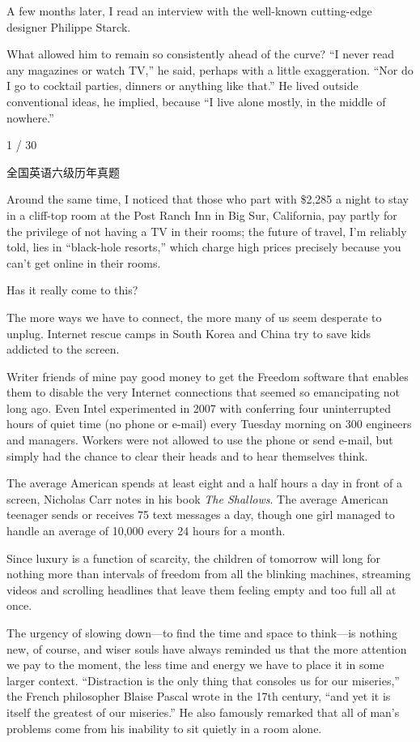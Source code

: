 \documentclass[UTF8,11pt]{ctexart}
\begin{document}
A few months later, I read an interview with the well-known cutting-edge designer Philippe Starck.


What allowed him to remain so consistently ahead of the curve? “I never read any magazines or watch TV,” he said, perhaps with a little exaggeration. “Nor do I go to cocktail parties, dinners or anything like that.” He lived outside conventional ideas, he implied, because “I live alone mostly, in the middle of nowhere.”


1 / 30


全国英语六级历年真题


Around the same time, I noticed that those who part with \$2,285 a night to stay in a cliff-top room at the Post Ranch Inn in Big Sur, California, pay partly for the privilege of not having a TV in their rooms; the future of travel, I’m reliably told, lies in “black-hole resorts,” which charge high prices precisely because you can’t get online in their rooms.


Has it really come to this?


The more ways we have to connect, the more many of us seem desperate to unplug. Internet rescue camps in South Korea and China try to save kids addicted to the screen.


Writer friends of mine pay good money to get the Freedom software that enables them to disable the very Internet connections that seemed so emancipating not long ago. Even Intel experimented in 2007 with conferring four uninterrupted hours of quiet time (no phone or e-mail) every Tuesday morning on 300 engineers and managers. Workers were not allowed to use the phone or send e-mail, but simply had the chance to clear their heads and to hear themselves think.


The average American spends at least eight and a half hours a day in front of a screen, Nicholas Carr notes in his book\textit{ The Shallows}. The average American teenager sends or receives 75 text messages a day, though one girl managed to handle an average of 10,000 every 24 hours for a month.


Since luxury is a function of scarcity, the children of tomorrow will long for nothing more than intervals of freedom from all the blinking machines, streaming videos and scrolling headlines that leave them feeling empty and too full all at once.


The urgency of slowing down—to find the time and space to think—is nothing new, of course, and wiser souls have always reminded us that the more attention we pay to the moment, the less time and energy we have to place it in some larger context. “Distraction is the only thing that consoles us for our miseries,” the French philosopher Blaise Pascal wrote in the 17th century, “and yet it is itself the greatest of our miseries.” He also famously remarked that all of man’s problems come from his inability to sit quietly in a room alone.
\end{document}
